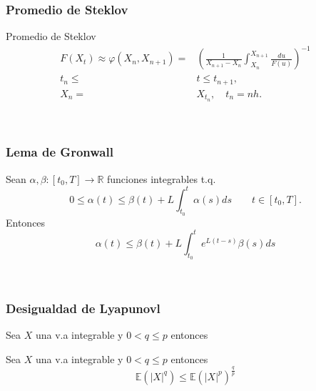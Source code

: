 \begin{frame}
  \frametitle{Promedio de Steklov}
	\hypertarget{dfn:Steklov}{}    
  \begin{overlayarea}{\textwidth}{.5\textwidth}
      \begin{block}{Promedio de Steklov} %
	  \begin{align*}	  		
	  		F(X_t)\approx \varphi(X_n,X_{n+1})=&
		        \left(
		        \frac{1}{X_{n+1}-X_{n}}
		        \int_{X_n}^{X_{n+1}} \frac{du}{F(u)}
		        \right)^{-1}\\
		      	t_n\leq & t \leq t_{n+1},\\
		      	X_n=&X_{t_n}, \quad t_n=nh.	 
	  \end{align*}
    \end{block}
  \end{overlayarea}   
\hyperlink{ex:EDEMult}{}\\
\hyperlink{Idea}{}  
\end{frame}
\begin{frame}
  \frametitle{Lema de Gronwall}
	\hypertarget{lem:Gronwall}{}    
     \begin{lema}[de Gronwall]
		Sean $\alpha,\beta:[t_0,T]\to\mathbb{R}$ funciones integrables t.q.
		$$
			0\leq \alpha(t)\leq \beta(t) +L \int_{t_0}^{t}\alpha(s)ds 
			\qquad t\in[t_0,T].
		$$
		Entonces 
		$$
			\alpha(t)\leq \beta(t)+L\int_{t_0}^{t} e^{L(t-s)}\beta(s)ds
		$$
		\end{lema}
	\hyperlink{prb:Consistencia2}{}\\
\end{frame}
\begin{frame}
  \frametitle{Desigualdad de Lyapunovl}
	\hypertarget{thm:DesLyapunov}{}    
	Sea $X$ una v.a integrable y $0<q\leq p$ entonces    
    \begin{block}{Sea $X$ una v.a integrable y $0<q\leq p$ entonces}
		$$    	
    		\mathbb{E}\left(\left|X\right|^{q}\right)\leq\mathbb{E}\left(\left|X\right|^{p}\right)^{\frac{q}{p}}
		$$    
    \end{block}
	\hyperlink{prb:Consistencia3}{}
\end{frame}
